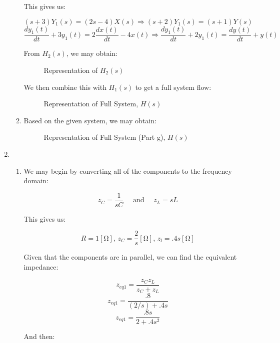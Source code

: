 \begin{enumerate}
\begin{enumerate}
        This gives us:

        $$(s+3)Y_1(s)=(2s-4)X(s)\Rightarrow (s+2)Y_1(s)=(s+1)Y(s)$$
        $$\frac{dy_1(t)}{dt}+3y_1(t)=2\frac{dx(t)}{dt}-4x(t)\Rightarrow \frac{dy_1(t)}{dt}+2y_1(t)=\frac{dy(t)}{dt}+y(t)$$

        From $H_2(s)$, we may obtain:

        \begin{figure}[H]
          \centering
          
          \caption{Representation of $H_2(s)$}
          \label{fig:3}
        \end{figure}

        We then combine this with $H_1(s)$ to get a full system flow:

        \begin{figure}[H]
          \centering
          
          \caption{Representation of Full System, $H(s)$}
          \label{fig:4}
        \end{figure}

      \item Based on the given system, we may obtain:

        \begin{figure}[H]
          \centering
          
          \caption{Representation of Full System (Part g), $H(s)$}
          \label{fig:5}
        \end{figure}

    \end{enumerate}

  \item

    \begin{enumerate}

      \item We may begin by converting all of the components to the frequency domain:

        $$z_C=\frac{1}{sC}\quad\text{ and }\quad z_L=sL$$

        This gives us:

        $$R=1[\si{\ohm}],\, z_C=\frac{2}{s}[\si{\ohm}],\, z_l=.4s[\si{\ohm}]$$

        Given that the components are in parallel, we can find the equivalent impedance:

        $$z_{eq1}=\frac{z_Cz_L}{z_C+z_L}$$
        $$z_{eq1}=\frac{.8}{(2/s)+.4s}$$
        $$z_{eq1}=\frac{.8s}{2+.4s^2}$$

        And then:


\end{enumerate}
\end{enumerate}
